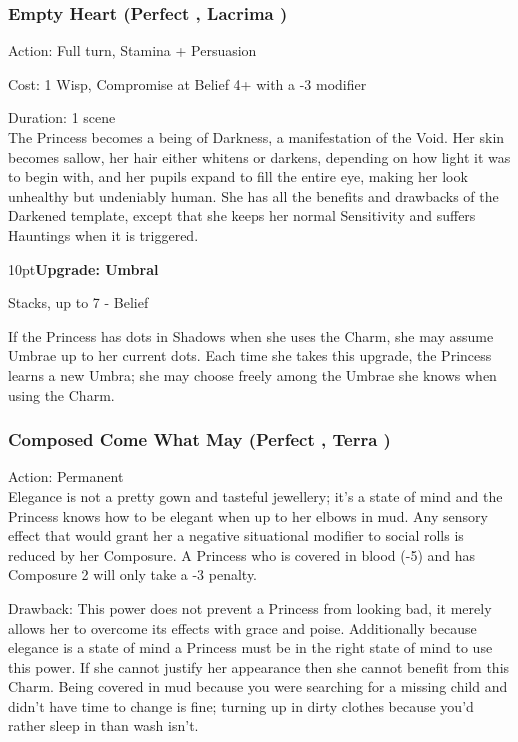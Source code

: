 \subsubsection*{Empty Heart (Perfect \textbullet\textbullet, Lacrima \textbullet\textbullet\textbullet\textbullet)}

\noindent Action: Full turn, Stamina + Persuasion

\noindent Cost: 1 Wisp, Compromise at Belief 4+ with a -3 modifier

\noindent Duration: 1 scene \\

\noindent The Princess becomes a being of Darkness, a manifestation of the Void. Her skin becomes sallow, her hair either whitens or darkens, depending on how light it was to begin with, and her pupils expand to fill the entire eye, making her look unhealthy but undeniably human. She has all the benefits and drawbacks of the Darkened template, except that she keeps her normal Sensitivity and suffers Hauntings when it is triggered.

\begin{myindentpar}{10pt}\textbf{Upgrade: Umbral}

Stacks, up to 7 - Belief

If the Princess has dots in Shadows when she uses the Charm, she may assume Umbrae up to her current dots. Each time she takes this upgrade, the Princess learns a new Umbra; she may choose freely among the Umbrae she knows when using the Charm. \end{myindentpar}

\subsubsection*{Composed Come What May (Perfect \textbullet\textbullet, Terra \textbullet\textbullet)}

\noindent Action: Permanent \\

\noindent Elegance is not a pretty gown and tasteful jewellery; it's a state of mind and the Princess knows how to be elegant when up to her elbows in mud. Any sensory effect that would grant her a negative situational modifier to social rolls is reduced by her Composure. A Princess who is covered in blood (-5) and has Composure 2 will only take a -3 penalty.

Drawback: This power does not prevent a Princess from looking bad, it merely allows her to overcome its effects with grace and poise. Additionally because elegance is a state of mind a Princess must be in the right state of mind to use this power. If she cannot justify her appearance then she cannot benefit from this Charm. Being covered in mud because you were searching for a missing child and didn't have time to change is fine; turning up in dirty clothes because you'd rather sleep in than wash isn't.

